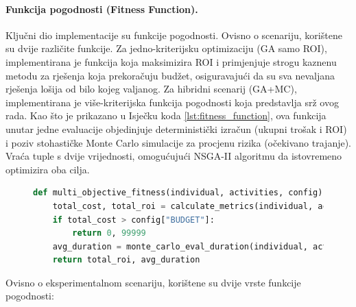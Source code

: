 \paragraph{Funkcija pogodnosti (Fitness Function).}
Ključni dio implementacije su funkcije pogodnosti. Ovisno o scenariju, korištene su dvije različite funkcije. Za jedno-kriterijsku optimizaciju (GA samo ROI), implementirana je funkcija koja maksimizira ROI i primjenjuje strogu kaznenu metodu za rješenja koja prekoračuju budžet, osiguravajući da su sva nevaljana rješenja lošija od bilo kojeg valjanog.
Za hibridni scenarij (GA+MC), implementirana je više-kriterijska funkcija pogodnosti koja predstavlja srž ovog rada. Kao što je prikazano u Isječku koda \ref{lst:fitness_function}, ova funkcija unutar jedne evaluacije objedinjuje deterministički izračun (ukupni trošak i ROI) i poziv stohastičke Monte Carlo simulacije za procjenu rizika (očekivano trajanje). Vraća tuple s dvije vrijednosti, omogućujući NSGA-II algoritmu da istovremeno optimizira oba cilja.
\begin{figure}
    \centering
\begin{lstlisting}[language=Python, caption={Više-kriterijska funkcija pogodnosti}, label={lst:fitness_function}, captionpos=b ]
def multi_objective_fitness(individual, activities, config):
    total_cost, total_roi = calculate_metrics(individual, activities)
    if total_cost > config["BUDGET"]:
        return 0, 99999
    avg_duration = monte_carlo_eval_duration(individual, activities, config)
    return total_roi, avg_duration
\end{lstlisting}
\end{figure}
Ovisno o eksperimentalnom scenariju, korištene su dvije vrste funkcije pogodnosti:
